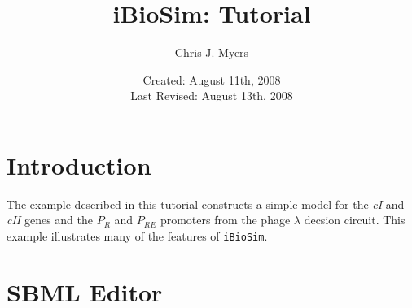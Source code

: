 \documentclass[titlepage,11pt]{article}
\title{iBioSim: Tutorial}
\author{Chris J. Myers}
\date{Created: August 11th, 2008\\
  Last Revised: August 13th, 2008
}
\begin{document}
\maketitle

  
\tableofcontents

\clearpage
  

\section{Introduction}

The example described in this tutorial constructs a simple model for
the \emph{cI} and \emph{cII} genes and the $P_R$ and $P_{RE}$
promoters from the phage $\lambda$ decsion circuit.  This example
illustrates many of the features of {\tt iBioSim}.


\section{SBML Editor}
\end{document}
